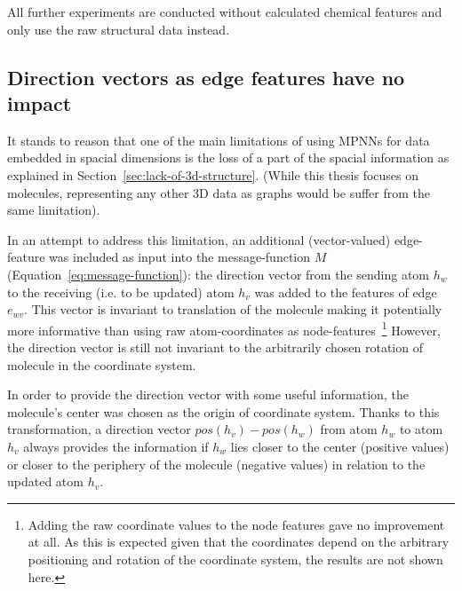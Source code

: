 All further experiments are conducted without calculated chemical features and only use the raw structural data instead.


\subsection{Direction vectors as edge features have no impact}
\label{sec:direction-vectors}

It stands to reason that one of the main limitations of using MPNNs for data embedded in spacial dimensions is the loss of a part of the spacial information as explained in Section~\ref{sec:lack-of-3d-structure}. (While this thesis focuses on molecules, representing any other 3D data as graphs would be suffer from the same limitation).
	
In an attempt to address this limitation, an additional (vector-valued) edge-feature was included as input into the message-function $M$ (Equation~\ref{eq:message-function}): the direction vector from the sending atom $h_w$ to the receiving (i.e. to be updated) atom $h_v$ was added to the features of edge $e_{wv}$. This vector is invariant to translation of the molecule making it potentially more informative than using raw atom-coordinates as node-features~\footnote{Adding the raw coordinate values to the node features gave no improvement at all. As this is expected given that the coordinates depend on the arbitrary positioning and rotation of the coordinate system, the results are not shown here.} However, the direction vector is still not invariant to the arbitrarily chosen rotation of molecule in the coordinate system.

In order to provide the direction vector with some useful information, the molecule's center was chosen as the origin of coordinate system. Thanks to this transformation, a direction vector $pos(h_v) - pos(h_w)$ from atom $h_w$ to atom $h_v$ always provides the information if $h_w$ lies closer to the center (positive values) or closer to the periphery of the molecule (negative values) in relation to the updated atom $h_v$.

